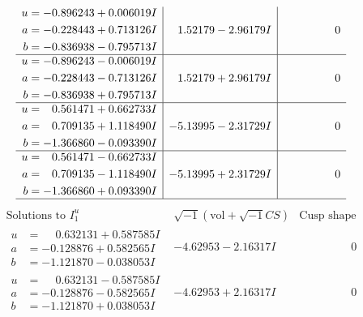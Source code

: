 \documentclass[1p]{elsarticle_modified}
\theoremstyle{definition}
\newcommand{\I}{\sqrt{-1}}
\begin{document}
$$\begin{array}{c|c|c}
\begin{aligned}
u &= -0.896243 + 0.006019 I \\
a &= -0.228443 + 0.713126 I \\
b &= -0.836938 - 0.795713 I\end{aligned}
 & \phantom{-}1.52179 - 2.96179 I & \phantom{-0.000000 } 0 \\ \hline\begin{aligned}
u &= -0.896243 - 0.006019 I \\
a &= -0.228443 - 0.713126 I \\
b &= -0.836938 + 0.795713 I\end{aligned}
 & \phantom{-}1.52179 + 2.96179 I & \phantom{-0.000000 } 0 \\ \hline\begin{aligned}
u &= \phantom{-}0.561471 + 0.662733 I \\
a &= \phantom{-}0.709135 + 1.118490 I \\
b &= -1.366860 - 0.093390 I\end{aligned}
 & -5.13995 - 2.31729 I & \phantom{-0.000000 } 0 \\ \hline\begin{aligned}
u &= \phantom{-}0.561471 - 0.662733 I \\
a &= \phantom{-}0.709135 - 1.118490 I \\
b &= -1.366860 + 0.093390 I\end{aligned}
 & -5.13995 + 2.31729 I & \phantom{-0.000000 } 0\\
 \hline 
 \end{array}$$\newpage$$\begin{array}{c|c|c}  
\text{Solutions to }I^u_{1}& \I (\text{vol} + \sqrt{-1}CS) & \text{Cusp shape}\\
 \hline 
\begin{aligned}
u &= \phantom{-}0.632131 + 0.587585 I \\
a &= -0.128876 + 0.582565 I \\
b &= -1.121870 - 0.038053 I\end{aligned}
 & -4.62953 - 2.16317 I & \phantom{-0.000000 } 0 \\ \hline\begin{aligned}
u &= \phantom{-}0.632131 - 0.587585 I \\
a &= -0.128876 - 0.582565 I \\
b &= -1.121870 + 0.038053 I\end{aligned}
 & -4.62953 + 2.16317 I & \phantom{-0.000000 } 0 \\ \hline\begin{aligned}

\end{aligned}
\end{array}$$
\end{document}
